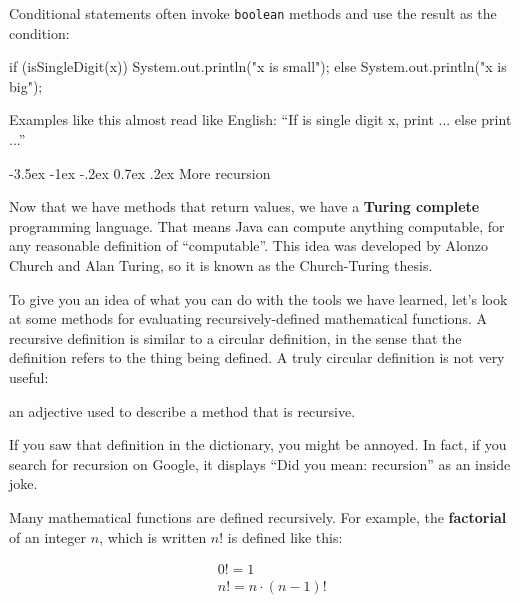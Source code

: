 \documentclass[12pt]{book}
\makeatletter
\newcommand{\term}[1]{%
\index{#1}
\item[#1:]}
\theoremstyle{exercise}
\newcommand{\java}[1]{\verb"#1"}
\renewcommand{\section}{\@startsection{section}{1}{\z@}%
    {-3.5ex \@plus -1ex \@minus -.2ex}%
    {0.7ex \@plus.2ex}%
    {\normalfont\Large\bfseries}}
\newcommand{\java}[1]{\lstinline{#1}} %
\makeatother
\begin{document}
Conditional statements often invoke \java{boolean} methods and use the result as the condition:

\begin{code}
    if (isSingleDigit(x)) {
        System.out.println("x is small");
    } else {
        System.out.println("x is big");
    }
\end{code}

Examples like this almost read like English: ``If is single digit x, print ... else print ...''


\section{More recursion}
\label{factorial}



Now that we have methods that return values, we have a {\bf Turing complete} programming language.
That means Java can compute anything computable, for any reasonable definition of ``computable''.
This idea was developed by Alonzo Church and Alan Turing, so it is known as the Church-Turing thesis.

To give you an idea of what you can do with the tools we have learned, let's look at some methods for evaluating recursively-defined mathematical functions.
A recursive definition is similar to a circular definition, in the sense that the definition refers to the thing being defined.
A truly circular definition is not very useful:

\begin{description}
\term{recursive} an adjective used to describe a method that is recursive.
\end{description}

If you saw that definition in the dictionary, you might be annoyed.
In fact, if you search for recursion on Google, it displays ``Did you mean: recursion'' as an inside joke.


Many mathematical functions are defined recursively.
For example, the {\bf factorial} of an integer $n$, which is written $n!$ is defined like this:

\vspace{-1ex}
\begin{eqnarray*}
&&  0! = 1 \\
&&  n! = n \cdot(n-1)!
\end{eqnarray*}
\vspace{-1ex}
\end{document}
